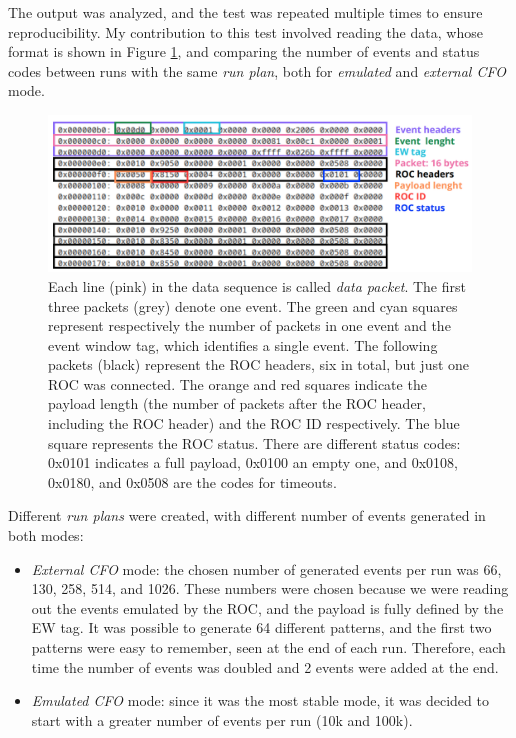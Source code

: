 The output was analyzed, and the test was repeated multiple times to ensure reproducibility. 
My contribution to this test involved reading the data, whose format is shown in Figure \ref{fig:dataformat}, 
and comparing the number of events and status codes between runs with the same \textit{run plan}, 
both for \textit{emulated} and \textit{external CFO} mode. 
\begin{figure}[!h]
  \centering
  \includegraphics[width=\textwidth]{figures/png/Screenshot_20240628_104216.png}
  \caption{Each line (pink) in the data sequence is called \textit{data packet}. 
  The first three packets (grey) denote one event. The green and cyan squares represent respectively
  the number of packets in one event and the event window tag, which identifies a single event. 
  The following packets (black) represent the ROC headers, six in total, but just one ROC was connected. 
  The orange and red squares indicate the payload length (the number of packets after 
  the ROC header, including the ROC header) and the ROC ID respectively. The blue square represents 
  the ROC status. There are different status codes: 0x0101 indicates a full payload, 0x0100 an empty one, 
  and 0x0108, 0x0180, and 0x0508 are the codes for timeouts.}
  \label{fig:dataformat}
\end{figure}
Different \textit{run plans} were created, with different number of events generated in both modes:
\begin{itemize}
  \item \textit{External CFO} mode: the chosen number of generated 
  events per run was 66, 130, 258, 514, and 1026. These numbers 
  were chosen because we were reading out the events emulated by 
  the ROC, and the payload is fully defined by the EW tag. 
  It was possible to generate 64 different patterns, and the 
  first two patterns were easy to remember, seen at the end of each run. 
  Therefore, each time the number of events was doubled and 2 events were added at the end.
  \item \textit{Emulated CFO} mode: since it was the most stable mode, 
  it was decided to start with a greater number of events per run (10k and 100k).
\end{itemize}


